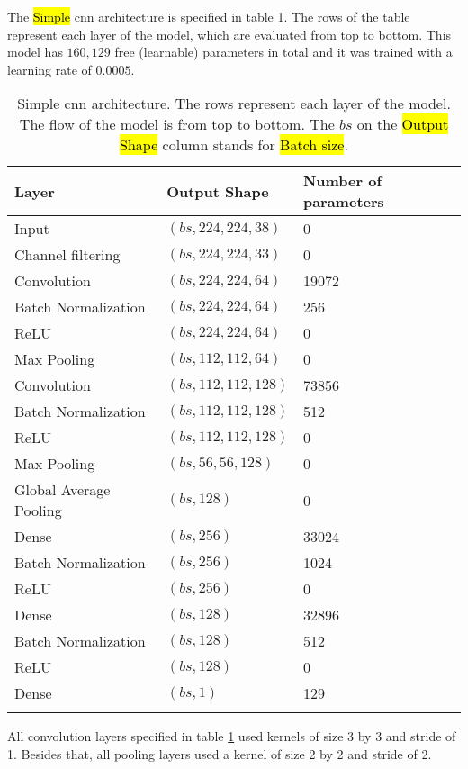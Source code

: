 

\graphicspath{{./Sections/Methodology/Resources/}}


The \hl{Simple} \gls{cnn} architecture is specified in table \ref{table:metho:models:simple}. The rows of the table represent each layer of the model, which are evaluated from top to bottom. This model has $160,129$ free (learnable) parameters in total and it was trained with a learning rate of $0.0005$.

\setlength{\mylinewidth}{\linewidth-7pt}%
\setlength{\mylengtha}{0.35\mylinewidth-2\arraycolsep}%
\setlength{\mylengthb}{0.25\mylinewidth-2\arraycolsep}%
\setlength{\mylengthc}{0.18\mylinewidth-2\arraycolsep}%

\begin{longtable}{m{\mylengtha} | m{\mylengthb} | m{\mylengthc}}
    \hline
    Layer & Output Shape & Number of parameters \\
    \hline
    Input & $(bs, 224, 224, 38)$ & 0 \\
    \hline
    Channel filtering & $(bs, 224, 224, 33)$ & 0 \\
    \hline
    Convolution & $(bs, 224, 224, 64)$ & 19072 \\
    \hline
    Batch Normalization & $(bs, 224, 224, 64)$ & 256 \\
    \hline
    ReLU & $(bs, 224, 224, 64)$ & 0 \\
    \hline
    Max Pooling & $(bs, 112, 112, 64)$ & 0 \\
    \hline
    Convolution & $(bs, 112, 112, 128)$ & 73856 \\
    \hline
    Batch Normalization & $(bs, 112, 112, 128)$ & 512 \\
    \hline
    ReLU & $(bs, 112, 112, 128)$ & 0 \\
    \hline
    Max Pooling & $(bs, 56, 56, 128)$ & 0 \\
    \hline
    Global Average Pooling & $(bs, 128)$ & 0 \\
    \hline
    Dense & $(bs, 256)$ & 33024 \\
    \hline
    Batch Normalization & $(bs, 256)$ & 1024 \\
    \hline
    ReLU & $(bs, 256)$ & 0 \\
    \hline
    Dense & $(bs, 128)$ & 32896 \\
    \hline
    Batch Normalization & $(bs, 128)$ & 512 \\
    \hline
    ReLU & $(bs, 128)$ & 0 \\
    \hline
    Dense & $(bs, 1)$ & 129 \\
    \hline
  \caption{Simple \gls{cnn} architecture. The rows represent each layer of the model. The flow of the model is from top to bottom. The $bs$ on the \hl{Output Shape} column stands for \hl{Batch size}.}
  \label{table:metho:models:simple}
\end{longtable}

All convolution layers specified in table \ref{table:metho:models:simple} used kernels of size 3 by 3 and stride of 1. Besides that, all pooling layers used a kernel of size 2 by 2 and stride of 2.
